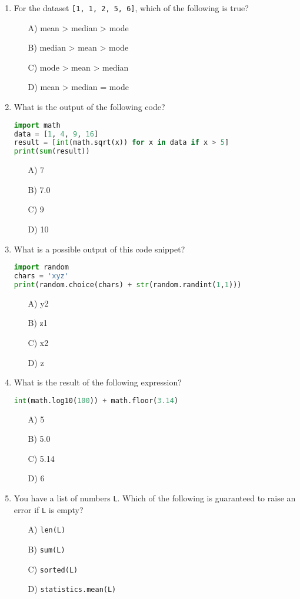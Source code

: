 \documentclass[9pt]{article}
\begin{document}
\begin{multicols}{2}
\begin{enumerate}
\item For the dataset \texttt{[1, 1, 2, 5, 6]}, which of the following is true?
\begin{enumerate}
    \item[A)] mean > median > mode
    \item[B)] median > mean > mode
    \item[C)] mode > mean > median
    \item[D)] mean > median = mode
\end{enumerate}

\item What is the output of the following code?
\begin{lstlisting}[language=Python]
import math
data = [1, 4, 9, 16]
result = [int(math.sqrt(x)) for x in data if x > 5]
print(sum(result))
\end{lstlisting}
\begin{enumerate}
\item[A)] 7
\item[B)] 7.0
\item[C)] 9
\item[D)] 10
\end{enumerate}

\item What is a possible output of this code snippet?
\begin{lstlisting}[language=Python]
import random
chars = 'xyz'
print(random.choice(chars) + str(random.randint(1,1)))
\end{lstlisting}
\begin{enumerate}
\item[A)] y2
\item[B)] z1
\item[C)] x2
\item[D)] z
\end{enumerate}

\item What is the result of the following expression?
\begin{lstlisting}[language=Python]
int(math.log10(100)) + math.floor(3.14)
\end{lstlisting}
\begin{enumerate}
\item[A)] 5
\item[B)] 5.0
\item[C)] 5.14
\item[D)] 6
\end{enumerate}

\item You have a list of numbers \texttt{L}. Which of the following is guaranteed to raise an error if \texttt{L} is empty?
\begin{enumerate}
    \item[A)] \texttt{len(L)}
    \item[B)] \texttt{sum(L)}
    \item[C)] \texttt{sorted(L)}
    \item[D)] \texttt{statistics.mean(L)}
\end{enumerate}


\end{enumerate}
\end{multicols}
\end{document}
